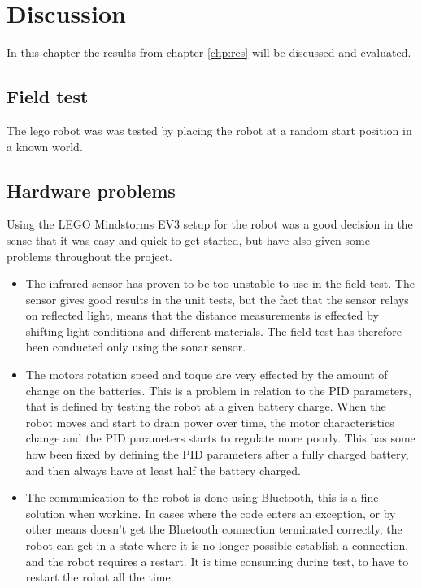 \chapter{Discussion}
\label{chp:disc}
In this chapter the results from chapter \ref{chp:res} will be discussed and evaluated.

\section{Field test}
The lego robot was was tested by placing the robot at a random start position in a known world. 

\section{Hardware problems}
Using the LEGO Mindstorms EV3 setup for the robot was a good decision in the sense that it was easy and quick to get started, but have also given some problems throughout the project.

\begin{itemize}
	\item The infrared sensor has proven to be too unstable to use in the field test.
	The sensor gives good results in the unit tests, but the fact that the sensor relays on reflected light, means that the distance measurements is effected by shifting light conditions and different materials.
	The field test has therefore been conducted only using the sonar sensor.
	\item The motors rotation speed and toque are very effected by the amount of change on the batteries.
	This is a problem in relation to the PID parameters, that is defined by testing the robot at a given battery charge.
	When the robot moves and start to drain power over time, the motor characteristics change and the PID parameters starts to regulate more poorly.
	This has some how been fixed by defining the PID parameters after a fully charged battery, and then always have at least half the battery charged.
	\item The communication to the robot is done using Bluetooth, this is a fine solution when working.
	In cases where the code enters an exception, or by other means doesn't get the Bluetooth connection terminated correctly, the robot can get in a state where it is no longer possible establish a connection, and the robot requires a restart.
	It is time consuming during test, to have to restart the robot all the time.
\end{itemize}

